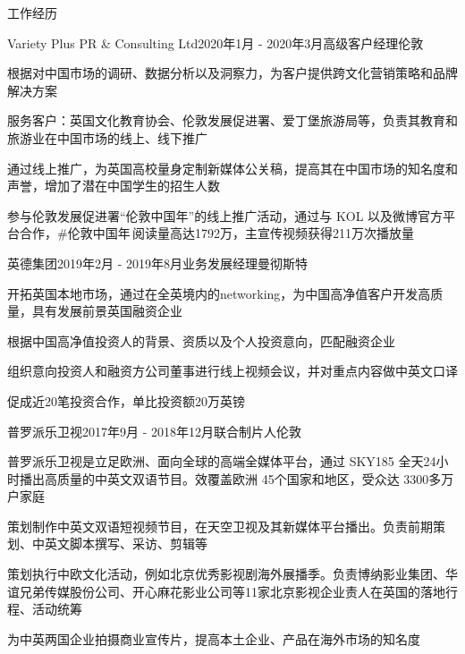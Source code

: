 \documentclass{resume} %
\begin{document}
\begin{rSection}{工作经历}

\begin{rSubsection}{Variety Plus PR \& Consulting Ltd}{2020年1月 - 2020年3月}{高级客户经理}{伦敦}
\item 根据对中国市场的调研、数据分析以及洞察力，为客户提供跨文化营销策略和品牌解决方案
\item 服务客户：英国文化教育协会、伦敦发展促进署、爱丁堡旅游局等，负责其教育和旅游业在中国市场的线上、线下推广
\item 通过线上推广，为英国高校量身定制新媒体公关稿，提高其在中国市场的知名度和声誉，增加了潜在中国学生的招生人数
\item 参与伦敦发展促进署“伦敦中国年”的线上推广活动，通过与 KOL 以及微博官方平台合作，\#伦敦中国年\,阅读量高达1792万，主宣传视频获得211万次播放量
\end{rSubsection}


\begin{rSubsection}{英德集团}{2019年2月 - 2019年8月}{业务发展经理}{曼彻斯特}
\item 开拓英国本地市场，通过在全英境内的networking，为中国高净值客户开发高质量，具有发展前景英国融资企业
\item 根据中国高净值投资人的背景、资质以及个人投资意向，匹配融资企业
\item 组织意向投资人和融资方公司董事进行线上视频会议，并对重点内容做中英文口译
\item 促成近20笔投资合作，单比投资额20万英镑
\end{rSubsection}


\begin{rSubsection}{普罗派乐卫视}{2017年9月 - 2018年12月}{联合制片人}{伦敦}
\item 普罗派乐卫视是立足欧洲、面向全球的高端全媒体平台，通过 SKY185 全天24小时播出高质量的中英文双语节目。效覆盖欧洲 45个国家和地区，受众达 3300多万户家庭
\item 策划制作中英文双语短视频节目，在天空卫视及其新媒体平台播出。负责前期策划、中英文脚本撰写、采访、剪辑等
\item 策划执行中欧文化活动，例如北京优秀影视剧海外展播季。负责博纳影业集团、华谊兄弟传媒股份公司、开心麻花影业公司等11家北京影视企业责人在英国的落地行程、活动统筹
\item 为中英两国企业拍摄商业宣传片，提高本土企业、产品在海外市场的知名度
\end{rSubsection}


\end{rSection}
\end{document}
